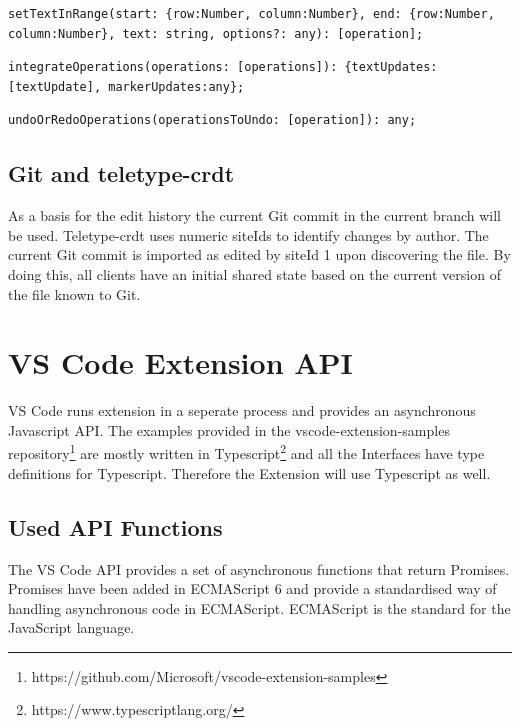 \begin{lstlisting}[label={lst:setTextInRange}, caption=teletype-crdt setTextInRange]
setTextInRange(start: {row:Number, column:Number}, end: {row:Number, column:Number}, text: string, options?: any): [operation];
\end{lstlisting}

\begin{lstlisting}[label={lst:integrateOperations}, caption=teletype-crdt integrateOperations]
integrateOperations(operations: [operations]): {textUpdates:[textUpdate], markerUpdates:any};
\end{lstlisting}

\begin{lstlisting}[label={lst:undoOrRedoOperations}, caption=teletype-crdt undoOrRedoOperations]
undoOrRedoOperations(operationsToUndo: [operation]): any;
\end{lstlisting}

\subsection{Git and teletype-crdt}
As a basis for the edit history  the current Git commit in the current branch will be used. Teletype-crdt uses numeric siteIds to identify changes by author. The current Git commit is imported as edited by siteId 1 upon discovering the file. By doing this, all clients have an initial shared state based on the current version of the file known to Git.

\section{VS Code Extension API}

VS Code runs extension in a seperate process and provides an asynchronous Javascript API.
The examples provided in the vscode-extension-samples repository\footnote{https://github.com/Microsoft/vscode-extension-samples} are mostly written in Typescript\footnote{https://www.typescriptlang.org/} and all the Interfaces have type definitions for Typescript.
Therefore the Extension will use Typescript as well.

\subsection{Used API Functions}

The VS Code API provides a set of asynchronous functions that return Promises. Promises have been added in ECMAScript 6 and provide a standardised way of handling asynchronous code in ECMAScript.\cite{Madsen:2017:MRJ:3152284.3133910} ECMAScript is the standard for the JavaScript language.

